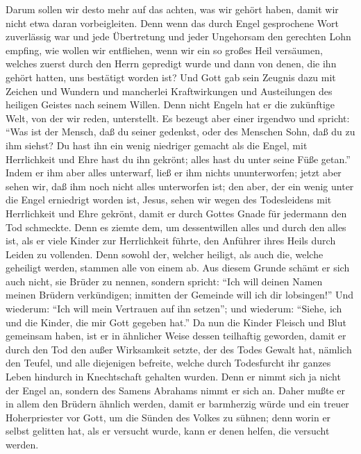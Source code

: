  Darum sollen wir desto mehr auf das achten, was wir
gehört haben, damit wir nicht etwa daran vorbeigleiten. 
Denn wenn das durch Engel gesprochene Wort zuverlässig war und jede
Übertretung und jeder Ungehorsam den gerechten Lohn empfing,
 wie wollen wir entfliehen, wenn wir ein so großes Heil
versäumen, welches zuerst durch den Herrn gepredigt wurde und dann von
denen, die ihn gehört hatten, uns bestätigt worden ist? 
Und Gott gab sein Zeugnis dazu mit Zeichen und Wundern und mancherlei
Kraftwirkungen und Austeilungen des heiligen Geistes nach seinem Willen.
 Denn nicht Engeln hat er die zukünftige Welt, von der wir
reden, unterstellt.  Es bezeugt aber einer irgendwo und
spricht: ``Was ist der Mensch, daß du seiner gedenkst, oder des Menschen
Sohn, daß du zu ihm siehst?  Du hast ihn ein wenig
niedriger gemacht als die Engel, mit Herrlichkeit und Ehre hast du ihn
gekrönt; alles hast du unter seine Füße getan.''  Indem er
ihm aber alles unterwarf, ließ er ihm nichts ununterworfen; jetzt aber
sehen wir, daß ihm noch nicht alles unterworfen ist;  den
aber, der ein wenig unter die Engel erniedrigt worden ist, Jesus, sehen
wir wegen des Todesleidens mit Herrlichkeit und Ehre gekrönt, damit er
durch Gottes Gnade für jedermann den Tod schmeckte.  Denn
es ziemte dem, um dessentwillen alles und durch den alles ist, als er
viele Kinder zur Herrlichkeit führte, den Anführer ihres Heils durch
Leiden zu vollenden.  Denn sowohl der, welcher heiligt,
als auch die, welche geheiligt werden, stammen alle von einem ab.
 Aus diesem Grunde schämt er sich auch nicht, sie Brüder
zu nennen, sondern spricht: ``Ich will deinen Namen meinen Brüdern
verkündigen; inmitten der Gemeinde will ich dir lobsingen!''
 Und wiederum: ``Ich will mein Vertrauen auf ihn
setzen''; und wiederum: ``Siehe, ich und die Kinder, die mir Gott
gegeben hat.''  Da nun die Kinder Fleisch und Blut
gemeinsam haben, ist er in ähnlicher Weise dessen teilhaftig geworden,
damit er durch den Tod den außer Wirksamkeit setzte, der des Todes
Gewalt hat, nämlich den Teufel,  und alle diejenigen
befreite, welche durch Todesfurcht ihr ganzes Leben hindurch in
Knechtschaft gehalten wurden.  Denn er nimmt sich ja
nicht der Engel an, sondern des Samens Abrahams nimmt er sich an.
 Daher mußte er in allem den Brüdern ähnlich werden,
damit er barmherzig würde und ein treuer Hoherpriester vor Gott, um die
Sünden des Volkes zu sühnen;  denn worin er selbst
gelitten hat, als er versucht wurde, kann er denen helfen, die versucht
werden.

